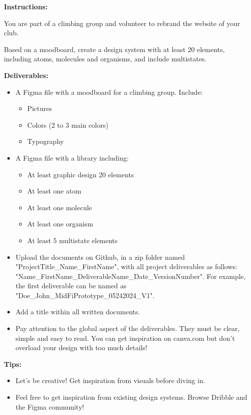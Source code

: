 \makeheaderfiles

\textbf{Instructions:}

You are part of a climbing group and volunteer to rebrand the website of your club.

Based on a moodboard, create a design system with at least 20 elements, including atoms, molecules and organisms, and include multistates.

\textbf{Deliverables:}

\begin{itemize}
\item A Figma file with a moodboard for a climbing group. Include:
\begin{itemize}
\item Pictures
\item Colors (2 to 3 main colors)
\item Typography
\end{itemize}
\item A Figma file with a library including:
\begin{itemize}
\item At least graphic design 20 elements
\item At least one atom
\item At least one molecule
\item At least one organism
\item At least 5 multistate elements
\end{itemize}
\item Upload the documents on Github, in a zip folder named "ProjectTitle\_Name\_FirstName", with all project deliverables as follows: "Name\_FirstName\_DeliverableName\_Date\_VersionNumber".  For example, the first deliverable can be named as "Doe\_John\_MidFiPrototype\_05242024\_V1".
\item Add a title within all written documents.
\item Pay attention to the global aspect of the deliverables. They must be clear, simple and easy to read. You can get inspiration on canva.com but don't overload your design with too much details!
\end{itemize}

\textbf{Tips:}

\begin{itemize}
\item Let's be creative! Get inspiration from visuals before diving in.
\item Feel free to get inspiration from existing design systems. Browse Dribble and the Figma community!
\end{itemize}

